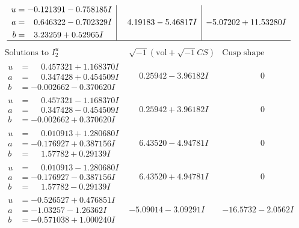 \documentclass[1p]{elsarticle_modified}
\theoremstyle{definition}
\newcommand{\I}{\sqrt{-1}}
\begin{document}
$$\begin{array}{c|c|c}
\begin{aligned}
u &= -0.121391 - 0.758185 I \\
a &= \phantom{-}0.646322 - 0.702329 I \\
b &= \phantom{-}3.23259 + 0.52965 I\end{aligned}
 & \phantom{-}4.19183 - 5.46817 I & -5.07202 + 11.53280 I\\
 \hline 
 \end{array}$$\newpage$$\begin{array}{c|c|c}  
\text{Solutions to }I^u_{2}& \I (\text{vol} + \sqrt{-1}CS) & \text{Cusp shape}\\
 \hline 
\begin{aligned}
u &= \phantom{-}0.457321 + 1.168370 I \\
a &= \phantom{-}0.347428 + 0.454509 I \\
b &= -0.002662 - 0.370620 I\end{aligned}
 & \phantom{-}0.25942 - 3.96182 I & \phantom{-0.000000 } 0 \\ \hline\begin{aligned}
u &= \phantom{-}0.457321 - 1.168370 I \\
a &= \phantom{-}0.347428 - 0.454509 I \\
b &= -0.002662 + 0.370620 I\end{aligned}
 & \phantom{-}0.25942 + 3.96182 I & \phantom{-0.000000 } 0 \\ \hline\begin{aligned}
u &= \phantom{-}0.010913 + 1.280680 I \\
a &= -0.176927 + 0.387156 I \\
b &= \phantom{-}1.57782 + 0.29139 I\end{aligned}
 & \phantom{-}6.43520 - 4.94781 I & \phantom{-0.000000 } 0 \\ \hline\begin{aligned}
u &= \phantom{-}0.010913 - 1.280680 I \\
a &= -0.176927 - 0.387156 I \\
b &= \phantom{-}1.57782 - 0.29139 I\end{aligned}
 & \phantom{-}6.43520 + 4.94781 I & \phantom{-0.000000 } 0 \\ \hline\begin{aligned}
u &= -0.526527 + 0.476851 I \\
a &= -1.03257 - 1.26362 I \\
b &= -0.571038 + 1.000240 I\end{aligned}
 & -5.09014 - 3.09291 I & -16.5732 - 2.0562 I \\ \hline\begin{aligned}

\end{aligned}
\end{array}$$
\end{document}
